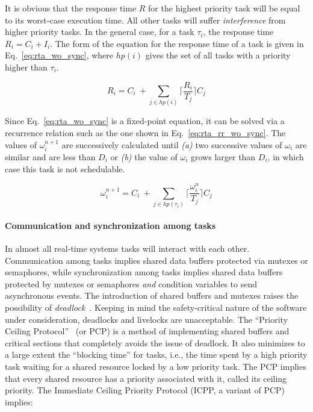 It is obvious that the response time $R$ for the highest priority task
will be equal to its worst-case execution time. All other tasks will
suffer \emph{interference} from higher priority tasks. In the general
case, for a task $\tau_i$, the response time $R_i = C_i + I_i$. The
form of the equation for the response time of a task is given in
Eq.~\ref{eq:rta_wo_sync}, where $hp(i)$ gives the set of all tasks
with a priority higher than $\tau_i$.

\begin{equation}
\label{eq:rta_wo_sync}
R_i = C_i \ + \sum_{j\in hp(i)} \bigg\lceil\frac{R_i}{T_j}\bigg\rceil C_j
\end{equation}

Since Eq.~\ref{eq:rta_wo_sync} is a fixed-point equation, it can be
solved via a recurrence relation such as the one shown in
Eq.~\ref{eq:rta_rr_wo_sync}. The values of $\omega_i^{n+1}$ are
successively calculated until \emph{(a)} two successive values of
$\omega_i$ are similar and are less than $D_i$ or \emph{(b)} the value
of $\omega_i$ grows larger than $D_i$, in which case this task is not
schedulable.

\begin{equation}
\label{eq:rta_rr_wo_sync}
\omega_i^{n+1}=C_i \ + \sum_{j \in hp(\tau_i)}
\bigg\lceil\frac{\omega_i^n}{T_j}\bigg\rceil C_j
\end{equation}

\paragraph{Communication and synchronization among tasks}
In almost all real-time systems tasks will interact with each
other. Communication among tasks implies shared data buffers protected
via mutexes or semaphores, while synchronization among tasks implies
shared data buffers protected by mutexes or semaphores \emph{and}
condition variables to send asynchronous events. The introduction of
shared buffers and mutexes raises the possibility of
\emph{deadlock}~\cite{levine@sigops03}. Keeping in mind the
safety-critical nature of the software under consideration, deadlocks
and livelocks are unacceptable. The ``Priority Ceiling
Protocol''~\cite{sha@toc90} (or PCP) is a method of implementing
shared buffers and critical sections that completely avoids the issue
of deadlock. It also minimizes to a large extent the ``blocking time''
for tasks, i.e., the time spent by a high priority task waiting for a
shared resource locked by a low priority task. The PCP implies that
every shared resource has a priority associated with it, called its
ceiling priority. The Immediate Ceiling Priority Protocol (ICPP, a
variant of PCP) implies:

